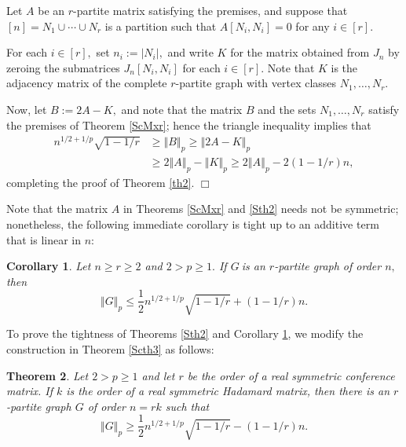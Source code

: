 \documentclass[12pt]{article}%
\newtheorem{theorem}{Theorem}[section]
\newtheorem{corollary}[theorem]{Corollary}
\newenvironment{proof}[1][Proof]{\noindent{\textbf {#1}  }}  {\hfill$\Box$\bigskip}
\begin{document}
\begin{proof}
Let $A$ be an $r$-partite matrix satisfying the premises, and suppose that
$\left[  n\right]  =N_{1}\cup\cdots\cup N_{r}$ is a partition such that
$A\left[  N_{i},N_{i}\right]  =0$ for any $i\in\left[  r\right]  .$

For each $i\in\left[  r\right]  ,$ set $n_{i}:=\left\vert N_{i}\right\vert ,$
and write $K$ for the matrix obtained from $J_{n}$ by zeroing the submatrices
$J_{n}\left[  N_{i},N_{i}\right]  $ for each $i\in\left[  r\right]  .$ Note
that $K$ is the adjacency matrix of the complete $r$-partite graph with vertex
classes $N_{1},\ldots,N_{r}.$

Now, let $B:=2A-K,$ and note that the matrix $B$ and the sets $N_{1}%
,\ldots,N_{r}$ satisfy the premises of Theorem \ref{ScMxr}; hence the triangle
inequality implies that%
\begin{align*}
n^{1/2+1/p}\sqrt{1-1/r}  &  \geq\left\Vert B\right\Vert _{p}\geq\left\Vert
2A-K\right\Vert _{p}\\
&  \geq2\left\Vert A\right\Vert _{p}-\left\Vert K\right\Vert _{p}%
\geq2\left\Vert A\right\Vert _{p}-2\left(  1-1/r\right)  n,
\end{align*}
completing the proof of Theorem \ref{th2}.
\end{proof}

Note that the matrix $A$ in Theorems \ref{ScMxr} and \ref{Sth2} needs not be
symmetric; nonetheless, the following immediate corollary is tight up to an
additive term that is linear in $n$:

\begin{corollary}
\label{Scor1}Let $n\geq r\geq2$ and $2>p\geq1.$ If $G\ $is an $r$-partite
graph of order $n,$ then
\begin{equation}
\left\Vert G\right\Vert _{p}\leq\frac{1}{2}n^{1/2+1/p}\sqrt{1-1/r}+\left(
1-1/r\right)  n. \label{Seab}%
\end{equation}

\end{corollary}

To prove the tightness of Theorems \ref{Sth2} and Corollary \ref{Scor1}, we
modify the construction in Theorem \ref{Scth3} as follows:

\begin{theorem}
\label{Sth4}Let $2>p\geq1$ and let $r$ be the order of a real symmetric
conference matrix. If $k$ is the order of a real symmetric Hadamard matrix,
then there is an $r$-partite graph $G$ of order $n=rk$ such that
\[
\left\Vert G\right\Vert _{p}\geq\frac{1}{2}n^{1/2+1/p}\sqrt{1-1/r}-\left(
1-1/r\right)  n.
\]

\end{theorem}
\end{document}
